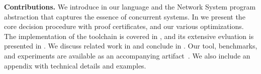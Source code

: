\smallskip
\noindent
\textbf{Contributions.}
We introduce in   our \toolname{} language and the Network System program abstraction that captures the essence of concurrent systems.
    In  we present the core decision procedure with proof certificates, and our various optimizations.
    The implementation of the \toolname{} toolchain is covered in , and its extensive evluation is presented in . 
%    
We discuss related work in  and conclude in .
%
Our tool, benchmarks, and experiments are available as an accompanying artifact~\cite{ArtifactRepository}.
% 
We also include an appendix with technical details and examples.